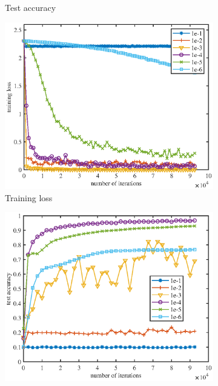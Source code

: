 \documentclass{article} %
\begin{document}
\begin{figure}[H]
\begin{subfigure}{.45\textwidth}
	\caption{\small  Test accuracy}
	\end{subfigure}
	\caption{Performance comparison of different stepsizes for DGD}\vspace{0.2in}
		\label{fig: sgd_curve}
	\begin{subfigure}{.45\textwidth}
	\centering
	\includegraphics[width=\textwidth]{figures/amsgrad_train.eps}
	\caption{\small Training loss}
	\end{subfigure}
\begin{subfigure}{.45\textwidth}
	\centering
		\includegraphics[width=\textwidth]{figures/amsgrad_test.eps}

\end{subfigure}
\end{figure}
\end{document}

